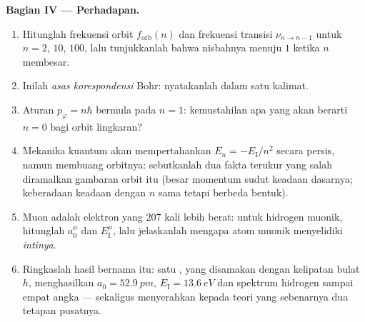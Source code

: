 \begin{problem}
\medskip\noindent\textbf{Bagian IV --- Perhadapan.}
\begin{enumerate}[resume]
  \item Hitunglah frekuensi orbit $f_{\text{orb}}(n)$ dan frekuensi
        transisi $\nu_{n \to n-1}$ untuk $n = 2$, $10$,
        $100$, lalu tunjukkanlah bahwa nisbahnya menuju $1$ ketika $n$
        membesar.
  \item Inilah \emph{asas korespondensi} Bohr: nyatakanlah dalam satu
        kalimat.
  \item Aturan $p_\varphi = n\hbar$ bermula pada $n = 1$: kemustahilan
        apa yang akan berarti $n = 0$ bagi orbit lingkaran?
  \item Mekanika kuantum akan mempertahankan $E_n = -E_{\text{I}}/n^2$
        secara persis, namun membuang orbitnya: sebutkanlah dua fakta
        terukur yang salah diramalkan gambaran orbit itu (besar momentum
        sudut keadaan dasarnya; keberadaan keadaan dengan $n$ sama tetapi
        berbeda bentuk).
  \item Muon adalah elektron yang $207$ kali lebih berat: untuk hidrogen
        muonik, hitunglah $a_0^\mu$ dan $E_{\text{I}}^\mu$, lalu
        jelaskanlah mengapa atom muonik menyelidiki \emph{intinya}.
  \item Ringkaslah hasil bernama itu: satu , yang
        disamakan dengan kelipatan bulat $h$, menghasilkan $a_0 = \qty{52.9}{pm}$,
        $E_{\text{I}} = \qty{13.6}{eV}$ dan spektrum hidrogen sampai
        empat angka --- sekaligus menyerahkan kepada teori yang
        sebenarnya dua tetapan pusatnya.
\end{enumerate}
\end{problem}
